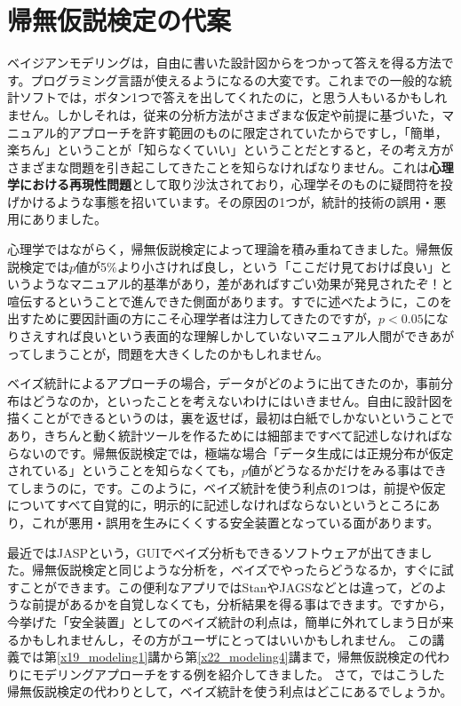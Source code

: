 \documentclass{ltjsbook}
\begin{document}
\section{帰無仮説検定の代案}
ベイジアンモデリングは，自由に書いた設計図からをつかって答えを得る方法です。プログラミング言語が使えるようになるの大変です。これまでの一般的な統計ソフトでは，ボタン1つで答えを出してくれたのに，と思う人もいるかもしれません。しかしそれは，従来の分析方法がさまざまな仮定や前提に基づいた，マニュアル的アプローチを許す範囲のものに限定されていたからですし，「簡単，楽ちん」ということが「知らなくていい」ということだとすると，その考え方がさまざまな問題を引き起こしてきたことを知らなければなりません。これは\textbf{心理学における再現性問題}\citep{Ikeda2016}として取り沙汰されており，心理学そのものに疑問符を投げかけるような事態を招いています。その原因の1つが，統計的技術の誤用・悪用にありました。

心理学ではながらく，帰無仮説検定によって理論を積み重ねてきました。帰無仮説検定では$p$値が5\%より小さければ良し，という「ここだけ見ておけば良い」というようなマニュアル的基準があり，差があればすごい効果が発見されたぞ！と喧伝するということで進んできた側面があります。すでに述べたように，このを出すために要因計画の方にこそ心理学者は注力してきたのですが，$p<0.05$になりさえすれば良いという表面的な理解しかしていないマニュアル人間ができあがってしまうことが，問題を大きくしたのかもしれません。

ベイズ統計によるアプローチの場合，データがどのように出てきたのか，事前分布はどうなのか，といったことを考えないわけにはいきません。自由に設計図を描くことができるというのは，裏を返せば，最初は白紙でしかないということであり，きちんと動く統計ツールを作るためには細部まですべて記述しなければならないのです。帰無仮説検定では，極端な場合「データ生成には正規分布が仮定されている」ということを知らなくても，$p$値がどうなるかだけをみる事はできてしまうのに，です。このように，ベイズ統計を使う利点の1つは，前提や仮定についてすべて自覚的に，明示的に記述しなければならないというところにあり，これが悪用・誤用を生みにくくする安全装置となっている面があります。

最近ではJASP\citep{JASP2021}という，GUIでベイズ分析もできるソフトウェアが出てきました。帰無仮説検定と同じような分析を，ベイズでやったらどうなるか，すぐに試すことができます。この便利なアプリではStanやJAGSなどとは違って，どのような前提があるかを自覚しなくても，分析結果を得る事はできます。ですから，今挙げた「安全装置」としてのベイズ統計の利点は，簡単に外れてしまう日が来るかもしれませんし，その方がユーザにとってはいいかもしれません。
この講義では第\ref{x19_modeling1}講から第\ref{x22_modeling4}講まで，帰無仮説検定の代わりにモデリングアプローチをする例を紹介してきました。
さて，ではこうした帰無仮説検定の代わりとして，ベイズ統計を使う利点はどこにあるでしょうか。
\end{document}
